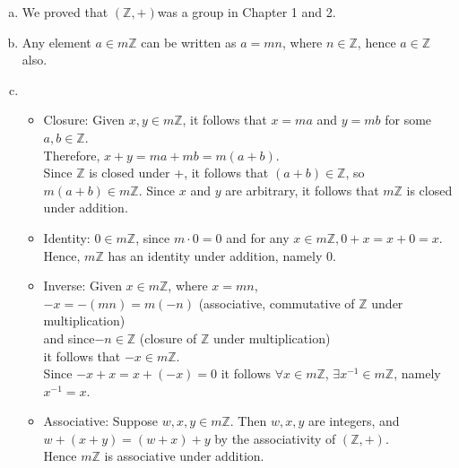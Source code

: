 \begin{enumerate}[(a)]
\item
We proved that $({\mathbb Z}, +)$was a group in Chapter 1 and 2.

\item
Any element $a \in m{\mathbb Z}$ can be written as $a = mn$, where $n \in {\mathbb Z}$, hence $a \in {\mathbb Z}$ also.

\item
	\begin{itemize}
	\item
	Closure: Given $x, y \in m{\mathbb Z}$, it follows that $x = ma$ and $y = mb$ for some $a, b \in {\mathbb Z}$.\\
	Therefore, $x + y = ma + mb = m(a + b)$.\\
	Since ${\mathbb Z}$ is closed under +, it follows that $(a + b) \in {\mathbb Z}$, so $m(a + b) \in m{\mathbb Z}$. Since $x$ and $y$ are arbitrary, it follows that $m{\mathbb Z}$ is closed under addition.

	\item
	Identity: $0 \in m{\mathbb Z}$, since $m \cdot 0 = 0$ and for any $x \in m{\mathbb Z}, 0 + x = x + 0 = x$.\\
	Hence, $m{\mathbb Z}$ has an identity under addition, namely 0.

	\item
	Inverse: Given $x \in m{\mathbb Z}$, where $x = mn$, \\
	$-x = -(mn) = m(-n)$ \quad \quad (associative, commutative of ${\mathbb Z}$ under multiplication)\\
	and since$-n \in {\mathbb Z}$ \quad \quad (closure of ${\mathbb Z}$ under multiplication)\\
	it follows that $-x \in m{\mathbb Z}$. \\
	Since $-x + x = x + (-x) = 0$ it follows $\forall x \in m{\mathbb Z}$, $\exists x ^{-1} \in m{\mathbb Z}$, namely $x^{-1} = x$.

	\item
	Associative: Suppose $w, x, y \in m{\mathbb Z}$. Then $w, x, y$ are integers, and $w + (x + y) = (w + x) + y$ by the associativity of $({\mathbb Z}, +)$.\\
	Hence $m{\mathbb Z}$ is associative under addition.\\

	\end{itemize}
\end{enumerate}

